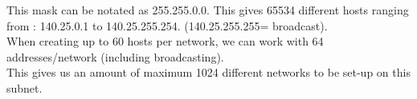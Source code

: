 This mask can be notated as 255.255.0.0. This gives 65534 different hosts ranging from : 140.25.0.1 to 140.25.255.254. (140.25.255.255= broadcast).\\
When creating up to 60 hosts per network, we can work with 64 addresses/network (including broadcasting).\\
This gives us an amount of maximum 1024 different networks to be set-up on this subnet.